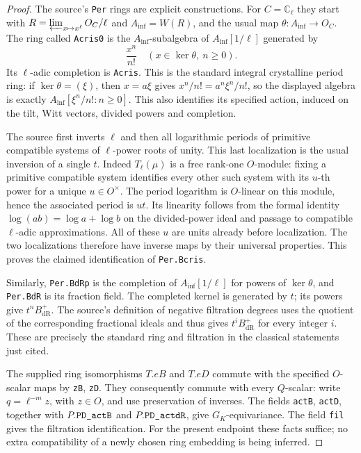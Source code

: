 \begin{proof}
The source's \texttt{Per} rings are explicit constructions.
For $C=\mathbb C_\ell$ they start with
$R=\varprojlim_{x\mapsto x^\ell}O_C/\ell$ and
$A_{\inf}=W(R)$, and the usual map
$\theta:A_{\inf}\to O_C$.
The ring called \texttt{Acris0} is the $A_{\inf}$-subalgebra of
$A_{\inf}[1/\ell]$ generated by
\[
                   \frac{x^n}{n!}\quad
          (x\in\ker\theta,\ n\ge0).
                                                               \tag{BX.2}
\]
Its $\ell$-adic completion is \texttt{Acris}.
This is the standard integral crystalline period ring: if
$\ker\theta=(\xi)$, then $x=a\xi$ gives
$x^n/n!=a^n\xi^n/n!$, so the displayed algebra is exactly
$A_{\inf}[\xi^n/n!:n\ge0]$.
This also identifies its specified action, induced on the tilt,
Witt vectors, divided powers and completion.

The source first inverts $\ell$ and then all logarithmic periods
of primitive compatible systems of $\ell$-power roots of unity.
This last localization is the usual inversion of a single $t$.
Indeed $T_\ell(\mu)$ is a free rank-one $O$-module: fixing a
primitive compatible system identifies every other such system
with its $u$-th power for a unique $u\in O^\times$.
The period logarithm is $O$-linear on this module, hence the
associated period is $ut$.  Its linearity follows from the
formal identity $\log(ab)=\log a+\log b$ on the divided-power
ideal and passage to compatible $\ell$-adic approximations.
All of these $u$ are units already before localization.
The two localizations therefore have inverse maps by their
universal properties.  This proves the claimed identification
of \texttt{Per.\allowbreak Bcris}.

Similarly, \texttt{Per.\allowbreak Bd\allowbreak Rp} is the completion of
$A_{\inf}[1/\ell]$ for powers of $\ker\theta$, and
\texttt{Per.\allowbreak Bd\allowbreak R} is its fraction field.  The completed kernel
is generated by $t$; its powers give $t^nB_{\mathrm{dR}}^+$.
The source's definition of negative filtration degrees uses the
quotient of the corresponding fractional ideals and thus gives
$t^iB_{\mathrm{dR}}^+$ for every integer $i$.
These are precisely the standard ring and filtration in the
classical statements just cited.

The supplied ring isomorphisms $T.eB$ and $T.eD$ commute with
the specified $O$-scalar maps by \texttt{z\allowbreak B}, \texttt{z\allowbreak D}.
They consequently commute with every $Q$-scalar: write
$q=\ell^{-m}z$, with $z\in O$, and use preservation of inverses.
The fields \texttt{act\allowbreak B}, \texttt{act\allowbreak D}, together with
$P.\texttt{PD\_act\allowbreak B}$ and $P.\texttt{PD\_actd\allowbreak R}$, give
$G_K$-equivariance.  The field \texttt{fil} gives the filtration
identification.  For the present endpoint these facts suffice;
no extra compatibility of a newly chosen ring embedding is
being inferred.


\end{proof}
